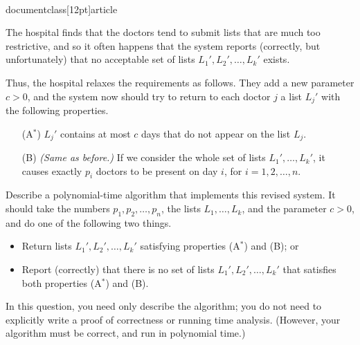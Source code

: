 \\documentclass[12pt]{article}
\begin{document}
\begin{enumerate}
The hospital finds that the doctors tend to submit lists
that are much too restrictive, and so it often happens
that the system reports (correctly, but unfortunately)
that no acceptable set of lists $L_1', L_2', \ldots, L_k'$ exists.

Thus, the hospital relaxes the requirements as follows.
They add a new parameter $c > 0$, and
the system now should try to return to each doctor $j$ a
list $L_j'$ with the following properties.
\begin{itemize}
\item[(A$^*$)] $L_j'$ contains at most $c$ days that
do not appear on the list $L_j$.
\item[(B)] {\em (Same as before.)}
If we consider the whole set of lists $L_1', \ldots, L_k'$,
it causes exactly $p_i$ doctors to be present on day $i$,
for $i = 1, 2, \ldots, n$.
\end{itemize}

Describe a polynomial-time algorithm that implements
this revised system.
It should take the
numbers $p_1, p_2, \ldots, p_n$,
the lists $L_1, \ldots, L_k$,
and the parameter $c > 0$,
and do one of the following two things.
\begin{itemize}
\item Return lists $L_1', L_2', \ldots, L_k'$
satisfying properties (A$^*$) and (B); or
\item Report (correctly) that there is no
set of lists $L_1', L_2', \ldots, L_k'$
that satisfies both properties (A$^*$) and (B).
\end{itemize}

In this question, you need only describe the algorithm;
you do not need to explicitly write a proof of correctness
or running time analysis.
(However, your algorithm must be correct, and run in polynomial time.)

\end{enumerate}
\end{document}

